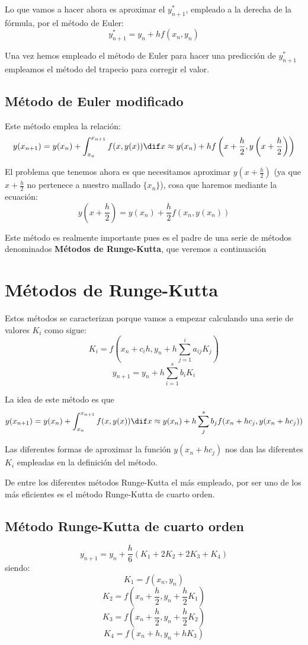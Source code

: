 \documentclass{apuntes}
\begin{document}
Lo que vamos a hacer ahora es aproximar el $y^*_{n+1}$, empleado a la derecha de la fórmula, por el método de Euler:
\[y^*_{n+1} = y_n + h f(x_n,y_n)\]

Una vez hemos empleado el método de Euler para hacer una predicción de $y^*_{n+1}$ empleamos el método del trapecio para corregir el valor.

\subsection{Método de Euler modificado}
Este método emplea la relación:
\[y(x_{n+1}) = y(x_n) + \int_{x_n}^{x_{n+1}} f(x,y(x))\dif x \approx y(x_n) + h f\left(x+\frac{h}{2},y\left(x+\frac{h}{2}\right)\right)\]


El problema que tenemos ahora es que necesitamos aproximar $y(x+\frac{h}{2})$ (ya que $x+\frac{h}{2}$ no pertenece a nuestro mallado $\{x_n\}$), cosa que haremos mediante la ecuación:
\[y(x+\frac{h}{2}) = y(x_n)+\frac{h}{2}f(x_n, y(x_n))\]

Este método es realmente importante pues es el padre de una serie de métodos denominados \textbf{Métodos de Runge-Kutta}, que veremos a continuación

\section{Métodos de Runge-Kutta}
Estos métodos se caracterizan porque vamos a empezar calculando una serie de valores $K_i$ como sigue:
\[K_i = f\left(x_n+c_ih, y_n+h \sum_{j=1}^ia_{ij}K_j\right)\]
\[y_{n+1} = y_n+ h \sum_{i=1}^s b_i K_i\]

La idea de este método es que
\[y(x_{n+1}) = y(x_n) + \int_{x_n}^{x_{n+1}} f(x,y(x))\dif x \approx y(x_n)+h \sum_{j}^{s} b_j f(x_n+hc_j, y(x_n+hc_j))\]

Las diferentes formas de aproximar la función $y(x_n+hc_j)$ nos dan las diferentes $K_i$ empleadas en la definición del método.

De entre los diferentes métodos Runge-Kutta el más empleado, por ser uno de los más eficientes es el método Runge-Kutta de cuarto orden.

\subsection{Método Runge-Kutta de cuarto orden}
\[y_{n+1} = y_n +\frac{h}{6}(K_1+2K_2+2K_3+K_4)\]
siendo:
\[K_1 = f(x_n,y_n)\]
\[K_2 = f(x_n+\frac{h}{2}, y_n+\frac{h}{2}K_1)\]
\[K_3 = f(x_n+\frac{h}{2}, y_n + \frac{h}{2}K_2)\]
\[K_4 = f(x_n+h, y_n + h K_3)\]
\end{document}
